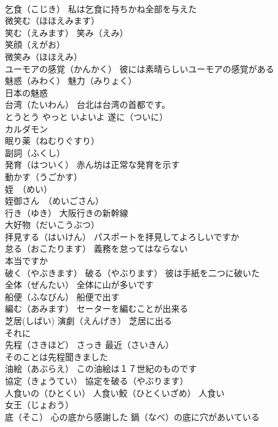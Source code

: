 \documentclass[8pt]{extreport}
\begin{document}
\begin{CJK}{UTF8}{min}
\\	乞食（こじき） 私は乞食に持ちかね全部を与えた
\\	微笑む（ほほえみます） 
\\	笑む（えみます） 笑み（えみ）
\\	笑顔（えがお）
\\	微笑み（ほほえみ）
\\	ユーモアの感覚（かんかく） 彼には素晴らしいユーモアの感覚がある
\\	魅惑（みわく） 魅力（みりょく）
\\	日本の魅惑
\\	台湾（たいわん） 台北は台湾の首都です。
\\	とうとう やっと いよいよ 遂に（ついに）
\\	カルダモン
\\	眠り薬（ねむりぐすり）
\\	副詞（ふくし）
\\	発育（はついく） 赤ん坊は正常な発育を示す
\\	動かす（うごかす）
\\	姪　（めい）
\\	姪御さん　（めいごさん）
\\	行き（ゆき） 大阪行きの新幹線
\\	大好物（だいこうぶつ）
\\	拝見する（はいけん） パスポートを拝見してよろしいですか
\\	怠る（おこたります） 義務を怠ってはならない
\\	本当ですか
\\	破く（やぶきます） 破る（やぶります） 彼は手紙を二つに破いた
\\	全体（ぜんたい） 全体に山が多いです
\\	船便（ふなびん） 船便で出す
\\	編む（あみます） セーターを編むことが出来る
\\	芝居(しばい) 演劇（えんげき） 芝居に出る
\\	それに
\\	先程（さきほど） さっき 最近（さいきん）
\\	そのことは先程聞きました
\\	油絵（あぶらえ） この油絵は１７世紀のものです
\\	協定（きょうてい） 協定を破る（やぶります）
\\	人食いの（ひとくい） 人食い鮫（ひとくいざめ） 人食い
\\	女王（じょおう）
\\	底（そこ） 心の底から感謝した 鍋（なべ）の底に穴があいている

\end{CJK}
\end{document}
